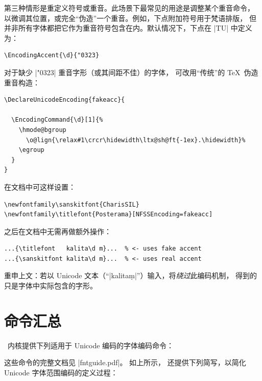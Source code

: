 \documentclass[a4paper]{l3doc}
\begin{document}
第三种情形是重定义符号或重音。此场景下最常见的用途是调整某个重音命令，
以微调其位置，或完全“伪造”一个重音。例如，下点附加符号用于梵语排版，
但并非所有字体都把它作为重音符号包含在内。默认情况下，下点在 |TU| 中定义为：
\begin{Verbatim}
\EncodingAccent{\d}{"0323}
\end{Verbatim}
对于缺少 |"0323| 重音字形（或其间距不佳）的字体，
可改用“传统”的 \TeX\ 伪造重音构造：
\begin{Verbatim}
\DeclareUnicodeEncoding{fakeacc}{
  
  \EncodingCommand{\d}[1]{%
    \hmode@bgroup
      \o@lign{\relax#1\crcr\hidewidth\ltx@sh@ft{-1ex}.\hidewidth}%
    \egroup
  }
}
\end{Verbatim}
在文档中可这样设置：
\begin{Verbatim}
\newfontfamily\sanskitfont{CharisSIL}
\newfontfamily\titlefont{Posterama}[NFSSEncoding=fakeacc]
\end{Verbatim}
之后在文档中无需再做额外操作：
\begin{Verbatim}
...{\titlefont   kalita\d m}...  % <- uses fake accent
...{\sanskitfont kalita\d m}...  % <- uses real accent
\end{Verbatim}
重申上文：若以 Unicode 文本（“|kalitaṃ|”）输入，将\emph{绕过}此编码机制，
得到的只是字体中实际包含的字形。


\section{命令汇总}

\LaTeXe\ 内核提供下列适用于 Unicode 编码的字体编码命令：
\begin{quote}\obeylines
\end{quote}
这些命令的完整文档见 |fntguide.pdf|。
如上所示， 还提供下列简写，以简化 Unicode 字体范围编码的定义过程：
\begin{quote}\obeylines
\end{quote}
\end{document}

